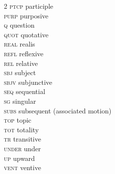 \begin{multicols}{2}
\textsc{ptcp} participle \\ 
\textsc{purp} purposive \\ 
\textsc{q} question \\ 
\textsc{quot} quotative \\ 
\textsc{real} realis \\ 
\textsc{refl} reflexive \\ 
\textsc{rel} relative \\ 
\textsc{sbj} subject \\ 
\textsc{sbjv} subjunctive \\ 
\textsc{seq} sequential \\ 
\textsc{sg} singular \\ 
\textsc{subs} subsequent (associated motion) \\ 
\textsc{top} topic \\ 
\textsc{tot} totality \\ 
\textsc{tr} transitive \\ 
\textsc{under} under \\ 
\textsc{up} upward \\ 
\textsc{vent} ventive \\ 

\end{multicols}
